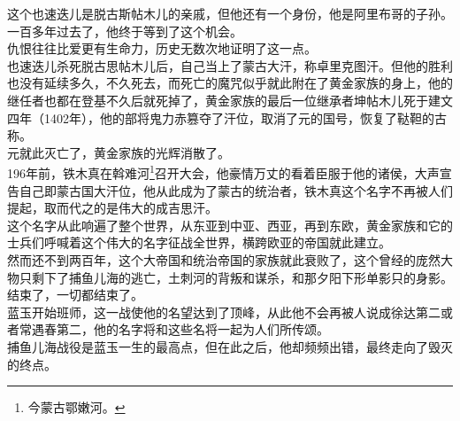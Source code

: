 \begin{multicols}{\theparacolNo}
这个也速迭儿是脱古斯帖木儿的亲戚，但他还有一个身份，他是阿里布哥的子孙。一百多年过去了，他终于等到了这个机会。\\

仇恨往往比爱更有生命力，历史无数次地证明了这一点。\\

也速迭儿杀死脱古思帖木儿后，自己当上了蒙古大汗，称卓里克图汗。但他的胜利也没有延续多久，不久死去，而死亡的魔咒似乎就此附在了黄金家族的身上，他的继任者也都在登基不久后就死掉了，黄金家族的最后一位继承者坤帖木儿死于建文四年（1402年），他的部将鬼力赤篡夺了汗位，取消了元的国号，恢复了鞑靼的古称。\\

元就此灭亡了，黄金家族的光辉消散了。\\

196年前，铁木真在斡难河\footnote{今蒙古鄂嫩河。}召开大会，他豪情万丈的看着臣服于他的诸侯，大声宣告自己即蒙古国大汗位，他从此成为了蒙古的统治者，铁木真这个名字不再被人们提起，取而代之的是伟大的成吉思汗。\\

这个名字从此响遍了整个世界，从东亚到中亚、西亚，再到东欧，黄金家族和它的士兵们呼喊着这个伟大的名字征战全世界，横跨欧亚的帝国就此建立。\\

然而还不到两百年，这个大帝国和统治帝国的家族就此衰败了，这个曾经的庞然大物只剩下了捕鱼儿海的逃亡，土刺河的背叛和谋杀，和那夕阳下形单影只的身影。\\

结束了，一切都结束了。\\

蓝玉开始班师，这一战使他的名望达到了顶峰，从此他不会再被人说成徐达第二或者常遇春第二，他的名字将和这些名将一起为人们所传颂。\\

捕鱼儿海战役是蓝玉一生的最高点，但在此之后，他却频频出错，最终走向了毁灭的终点。\\
\ifnum{}
	\end{multicols}
\fi
\newpage
